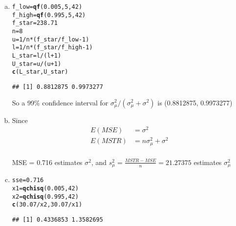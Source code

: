 \documentclass{article}\usepackage[]{graphicx}\usepackage[]{color}
\makeatletter
\newcommand{\hlnum}[1]{\textcolor[rgb]{0.686,0.059,0.569}{#1}}%
\newcommand{\hlopt}[1]{\textcolor[rgb]{0,0,0}{#1}}%
\newcommand{\hlstd}[1]{\textcolor[rgb]{0.345,0.345,0.345}{#1}}%
\newcommand{\hlkwb}[1]{\textcolor[rgb]{0.69,0.353,0.396}{#1}}%
\newcommand{\hlkwd}[1]{\textcolor[rgb]{0.737,0.353,0.396}{\textbf{#1}}}%
\newenvironment{kframe}{%
 \def\at@end@of@kframe{}%
 \ifinner\ifhmode%
  \def\at@end@of@kframe{\end{minipage}}%
  \begin{minipage}{\columnwidth}%
 \fi\fi%
 \def\FrameCommand##1{\hskip\@totalleftmargin \hskip-\fboxsep
 \colorbox{shadecolor}{##1}\hskip-\fboxsep
     \hskip-\linewidth \hskip-\@totalleftmargin \hskip\columnwidth}%
 \MakeFramed {\advance\hsize-\width
   \@totalleftmargin\z@ \linewidth\hsize
   \@setminipage}}%
 {\par\unskip\endMakeFramed%
 \at@end@of@kframe}
\newenvironment{knitrout}{}{} %
\makeatother
\begin{document}
\begin{enumerate}[(a)]

\item

\begin{knitrout}
\color{fgcolor}\begin{kframe}
\begin{alltt}
  \hlstd{f_low} \hlkwb{=} \hlkwd{qf}\hlstd{(}\hlnum{0.005}\hlstd{,} \hlnum{5}\hlstd{,} \hlnum{42}\hlstd{)}
  \hlstd{f_high} \hlkwb{=} \hlkwd{qf}\hlstd{(}\hlnum{0.995}\hlstd{,} \hlnum{5}\hlstd{,} \hlnum{42}\hlstd{)}
  \hlstd{f_star} \hlkwb{=} \hlnum{238.71}
  \hlstd{n} \hlkwb{=} \hlnum{8}
  \hlstd{u} \hlkwb{=} \hlnum{1}\hlopt{/}\hlstd{n}\hlopt{*}\hlstd{(f_star}\hlopt{/}\hlstd{f_low} \hlopt{-} \hlnum{1}\hlstd{)}
  \hlstd{l} \hlkwb{=} \hlnum{1}\hlopt{/}\hlstd{n}\hlopt{*}\hlstd{(f_star}\hlopt{/}\hlstd{f_high} \hlopt{-} \hlnum{1}\hlstd{)}
  \hlstd{L_star} \hlkwb{=} \hlstd{l}\hlopt{/}\hlstd{(l}\hlopt{+}\hlnum{1}\hlstd{)}
  \hlstd{U_star} \hlkwb{=} \hlstd{u}\hlopt{/}\hlstd{(u}\hlopt{+}\hlnum{1}\hlstd{)}
  \hlkwd{c}\hlstd{(L_star, U_star)}
\end{alltt}
\begin{verbatim}
## [1] 0.8812875 0.9973277
\end{verbatim}
\end{kframe}
\end{knitrout}

So a 99\% confidence interval for $\sigma_\mu^2/(\sigma_\mu^2+\sigma^2)$ is (0.8812875, 0.9973277)

\item

Since
\begin{displaymath}
\begin{split}
E(MSE) &= \sigma^2\\
E(MSTR) &= n\sigma_\mu^2+\sigma^2\\
\end{split}
\end{displaymath}

\quad MSE = 0.716 estimates $\sigma^2$, and $s_\mu^2=\frac{MSTR-MSE}{n}=21.27375$ estimates $\sigma_\mu^2$

\item

\begin{knitrout}
\color{fgcolor}\begin{kframe}
\begin{alltt}
  \hlstd{sse} \hlkwb{=} \hlnum{0.716}
  \hlstd{x1} \hlkwb{=} \hlkwd{qchisq}\hlstd{(}\hlnum{0.005}\hlstd{,} \hlnum{42}\hlstd{)}
  \hlstd{x2} \hlkwb{=} \hlkwd{qchisq}\hlstd{(}\hlnum{0.995}\hlstd{,} \hlnum{42}\hlstd{)}
  \hlkwd{c}\hlstd{(}\hlnum{30.07}\hlopt{/}\hlstd{x2,} \hlnum{30.07}\hlopt{/}\hlstd{x1)}
\end{alltt}
\begin{verbatim}
## [1] 0.4336853 1.3582695
\end{verbatim}
\end{kframe}
\end{knitrout}


\end{enumerate}
\end{document}
